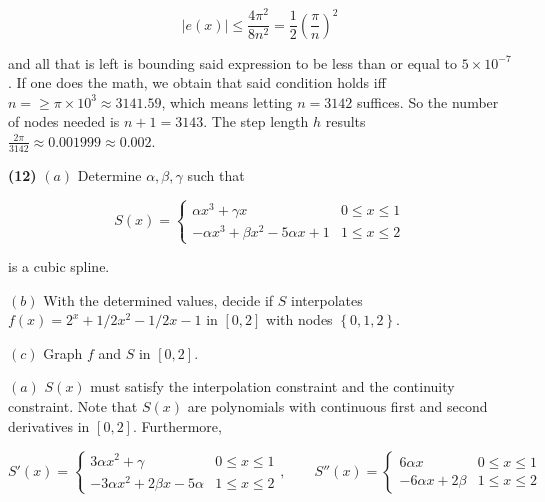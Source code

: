\documentclass[12pt]{article}
\theoremstyle{definition}
\begin{document}
\begin{equation*}
    \left| e(x) \right|  \leq \frac{4\pi^2}{8n^2} = \frac{1}{2}\left(
    \frac{\pi}{n} \right)^2
\end{equation*}

and all that is left is bounding said expression to be less than or equal to $5
\times 10^{-7}$. If one does the math, we obtain that said condition holds iff 
$n = \geq \pi \times 10^3 \approx 3141.59$, which means letting $n = 3142$
suffices. So the number of nodes needed is $n+1 = 3143$. The step length 
$h$ results $\frac{2\pi}{3142} \approx 0.001999 \approx 0.002$.

\pagebreak 

\begin{shaded}
    \textbf{(12)} $(a)$ Determine $\alpha, \beta, \gamma$ such that 

    \begin{equation*}
        S(x) = \begin{cases}
            \alpha x^3 + \gamma x & 0 \leq x \leq 1 \\ 
            -\alpha x^3 + \beta x^2 - 5\alpha x + 1 & 1 \leq x \leq 2
        \end{cases}
    \end{equation*}

    is a cubic spline.

    $(b)$ With the determined values, decide if $S$ interpolates $f(x) = 2^x +
    1 / 2 x^2 - 1 / 2 x - 1$ in $[0, 2]$  with nodes $\left\{ 0, 1, 2 \right\}
    $. 

    $(c)$ Graph $f$ and $S$ in $[0, 2]$.
\end{shaded}

$(a)$ $S(x)$ must satisfy the interpolation constraint and the continuity
constraint. Note that $S(x)$ are polynomials with continuous first and second
derivatives in $[0, 2]$. Furthermore, 

\begin{equation*}
    S'(x) = \begin{cases}
        3\alpha x^2 + \gamma & 0 \leq x \leq 1 \\ 
        -3\alpha x^2 + 2\beta x - 5\alpha & 1 \leq x \leq 2
    \end{cases}, \qquad S''(x) = \begin{cases}
        6\alpha x & 0 \leq x \leq 1 \\ 
        -6\alpha x + 2 \beta & 1 \leq x \leq 2
    \end{cases}
\end{equation*}
\end{document}
